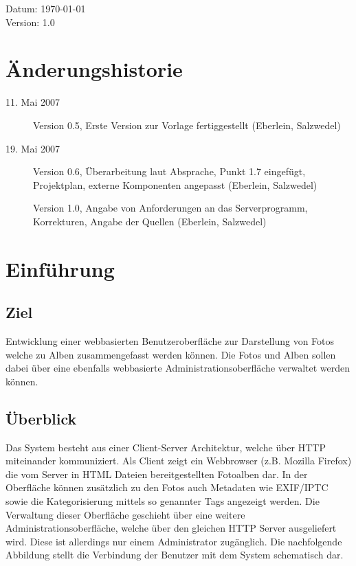 \documentclass[a4paper,12pt,liststotocnumbered]{scrartcl}
\newcommand{\lxVersion}[0]{1.0}
\begin{document}
\begin{center}
	Datum: \today\\
	Version: \lxVersion
\end{center}

\newpage

\section*{Änderungshistorie}
\begin{description}
	\item[11. Mai 2007] Version 0.5, Erste Version zur Vorlage
		fertiggestellt (Eberlein, Salzwedel)
	\item[19. Mai 2007] Version 0.6, Überarbeitung laut Absprache, Punkt
		1.7 eingefügt, Projektplan, externe Komponenten angepasst
		(Eberlein, Salzwedel)
	\item[] Version 1.0, Angabe von Anforderungen an das
		Serverprogramm, Korrekturen, Angabe der Quellen (Eberlein,
		Salzwedel)
\end{description}
\newpage

\tableofcontents

\newpage

\section{Einführung}
\subsection{Ziel}

Entwicklung einer webbasierten Benutzeroberfläche zur Darstellung von Fotos
welche zu Alben zusammengefasst werden können. Die Fotos und Alben sollen
dabei über eine ebenfalls webbasierte Administrationsoberfläche verwaltet
werden können.

\subsection{Überblick}

Das System besteht aus einer Client-Server Architektur, welche über HTTP
miteinander kommuniziert. Als Client zeigt ein Webbrowser (z.B. Mozilla
Firefox) die vom Server in HTML Dateien bereitgestellten Fotoalben dar. In der
Oberfläche können zusätzlich zu den Fotos auch Metadaten wie EXIF/IPTC sowie
die Kategorisierung mittels so genannter Tags angezeigt werden. Die Verwaltung
dieser Oberfläche geschieht über eine weitere Administrationsoberfläche,
welche über den gleichen HTTP Server ausgeliefert wird. Diese ist allerdings
nur einem Administrator zugänglich. Die nachfolgende Abbildung stellt die
Verbindung der Benutzer mit dem System schematisch dar.
\end{document}

